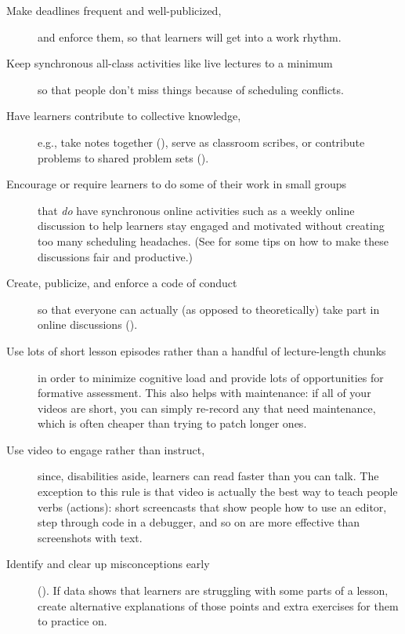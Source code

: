 \begin{description}

\item[Make deadlines frequent and well-publicized,] and enforce them,
  so that learners will get into a work rhythm.

\item[Keep synchronous all-class activities like live lectures to a
  minimum] so that people don't miss things because of scheduling
  conflicts.

\item[Have learners contribute to collective knowledge,] e.g., take
  notes together (), serve as classroom
  scribes, or contribute problems to shared problem sets
  ().

\item[Encourage or require learners to do some of their work in small
  groups] that \emph{do} have synchronous online activities such as a
  weekly online discussion to help learners stay engaged and motivated
  without creating too many scheduling headaches.  (See
   for some tips on how to make these discussions
  fair and productive.)

\item[Create, publicize, and enforce a code of conduct] so that
  everyone can actually (as opposed to theoretically) take part in
  online discussions ().

\item[Use lots of short lesson episodes rather than a handful of
  lecture-length chunks] in order to minimize cognitive load and
  provide lots of opportunities for formative assessment.  This also
  helps with maintenance: if all of your videos are short, you can
  simply re-record any that need maintenance, which is often cheaper
  than trying to patch longer ones.

\item[Use video to engage rather than instruct,] since, disabilities
  aside, learners can read faster than you can talk. The exception to
  this rule is that video is actually the best way to teach people
  verbs (actions): short screencasts that show people how to use an
  editor, step through code in a debugger, and so on are more
  effective than screenshots with text.

\item[Identify and clear up misconceptions early]
  (). If data shows that learners are struggling
  with some parts of a lesson, create alternative explanations of
  those points and extra exercises for them to practice on.

\end{description}

